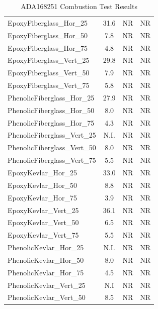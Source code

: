 \documentclass{abstract}
\begin{document}
\begin{table}[htbp]
	\centering
	\caption{ADA168251 Combustion Test Results}
	\label{tab:combustion_results_2}
	\begin{tabularx}{\textwidth}{|L|c|c|c|}
		\hline
		 &  &  &  \\
		\hline
		EpoxyFiberglass\_Hor\_25 & 31.6 & NR & NR \\
		\hline
		EpoxyFiberglass\_Hor\_50 & 7.8 & NR & NR \\
		\hline
		EpoxyFiberglass\_Hor\_75 & 4.8 & NR & NR \\
		\hline
		EpoxyFiberglass\_Vert\_25 & 29.8 & NR & NR \\
		\hline
		EpoxyFiberglass\_Vert\_50 & 7.9 & NR & NR \\
		\hline
		EpoxyFiberglass\_Vert\_75 & 5.8 & NR & NR \\
		\hline
		PhenolicFiberglass\_Hor\_25 & 27.9 & NR & NR \\
		\hline
		PhenolicFiberglass\_Hor\_50 & 8.0 & NR & NR \\
		\hline
		PhenolicFiberglass\_Hor\_75 & 4.3 & NR & NR \\
		\hline
		PhenolicFiberglass\_Vert\_25 & N.I. & NR & NR \\
		\hline
		PhenolicFiberglass\_Vert\_50 & 8.0 & NR & NR \\
		\hline
		PhenolicFiberglass\_Vert\_75 & 5.5 & NR & NR \\
		\hline
		EpoxyKevlar\_Hor\_25 & 33.0 & NR & NR \\
		\hline
		EpoxyKevlar\_Hor\_50 & 8.8 & NR & NR \\
		\hline
		EpoxyKevlar\_Hor\_75 & 3.9 & NR & NR \\
		\hline
		EpoxyKevlar\_Vert\_25 & 36.1 & NR & NR \\
		\hline
		EpoxyKevlar\_Vert\_50 & 6.5 & NR & NR \\
		\hline
		EpoxyKevlar\_Vert\_75 & 5.5 & NR & NR \\
		\hline
		PhenolicKevlar\_Hor\_25 & N.I. & NR & NR \\
		\hline
		PhenolicKevlar\_Hor\_50 & 8.0 & NR & NR \\
		\hline
		PhenolicKevlar\_Hor\_75 & 4.5 & NR & NR \\
		\hline
		PhenolicKevlar\_Vert\_25 & N.I & NR & NR \\
		\hline
		PhenolicKevlar\_Vert\_50 & 8.5 & NR & NR \\
		\hline

\end{tabularx}
\end{table}
\end{document}
